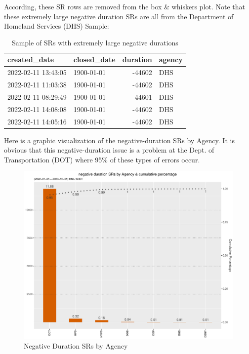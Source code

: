 \documentclass[12pt, titlepage]{article}
\begin{document}
	According, these  SR rows are removed from the box \& whiskers plot. 
	Note that these extremely large negative duration SRs are all from the 
	Department of Homeland Services (DHS) Sample: 
	
	\begin{table}[tbp]
	    \centering
	    \caption{Sample of SRs with extremely large negative durations}
		    \begin{tabular}{l l r l}
		        \toprule
		        \textbf{created\_date} & \textbf{closed\_date} & \textbf{duration} 
		        & \textbf{agency} \\
			        \midrule
			        2022-02-11 13:43:05 & 1900-01-01 & -44602 & DHS \\
			        2022-02-11 11:03:38 & 1900-01-01 & -44602 & DHS \\
			        2022-02-11 08:29:49 & 1900-01-01 & -44601 & DHS \\
			        2022-02-11 14:08:08 & 1900-01-01 & -44602 & DHS \\
			        2022-02-11 14:05:16 & 1900-01-01 & -44602 & DHS \\
			        \bottomrule
		    \end{tabular}
	    \label{tab:extreme_negative_durations}
	\end{table}
	
	Here is a graphic visualization of the negative-duration SRs by Agency. It is 
	obvious that this negative-duration issue is a problem at the 
	Dept. of Transportation (DOT) where 95\% of these types of errors occur. 
	
	\begin{figure}[tbp]
	 	 \centering
	 	 \includegraphics[width = \textwidth]{negative_duration_SR_barchart.pdf}
		  \caption{Negative Duration SRs by Agency}
		  \label{fig:negative-duration}
	\end{figure}
	
\end{document}

